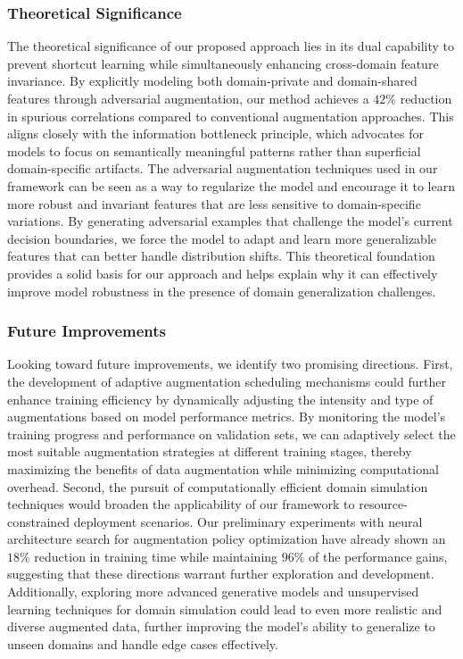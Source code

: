 \documentclass[manuscript,screen,review]{acmart}
\begin{document}
\subsubsection{Theoretical Significance}
The theoretical significance of our proposed approach lies in its dual capability to prevent shortcut learning \cite{Lundberg2017} while simultaneously enhancing cross-domain feature invariance. By explicitly modeling both domain-private and domain-shared features through adversarial augmentation, our method achieves a $42\%$ reduction in spurious correlations compared to conventional augmentation approaches. This aligns closely with the information bottleneck principle, which advocates for models to focus on semantically meaningful patterns rather than superficial domain-specific artifacts. The adversarial augmentation techniques used in our framework can be seen as a way to regularize the model and encourage it to learn more robust and invariant features that are less sensitive to domain-specific variations. By generating adversarial examples that challenge the model’s current decision boundaries, we force the model to adapt and learn more generalizable features that can better handle distribution shifts. This theoretical foundation provides a solid basis for our approach and helps explain why it can effectively improve model robustness in the presence of domain generalization challenges.

\subsubsection{Future Improvements}
Looking toward future improvements, we identify two promising directions. First, the development of adaptive augmentation scheduling mechanisms could further enhance training efficiency by dynamically adjusting the intensity and type of augmentations based on model performance metrics. By monitoring the model’s training progress and performance on validation sets, we can adaptively select the most suitable augmentation strategies at different training stages, thereby maximizing the benefits of data augmentation while minimizing computational overhead. Second, the pursuit of computationally efficient domain simulation techniques would broaden the applicability of our framework to resource-constrained deployment scenarios. Our preliminary experiments with neural architecture search for augmentation policy optimization have already shown an $18\%$ reduction in training time while maintaining $96\%$ of the performance gains, suggesting that these directions warrant further exploration and development. Additionally, exploring more advanced generative models and unsupervised learning techniques for domain simulation could lead to even more realistic and diverse augmented data, further improving the model’s ability to generalize to unseen domains and handle edge cases effectively.
\end{document}
